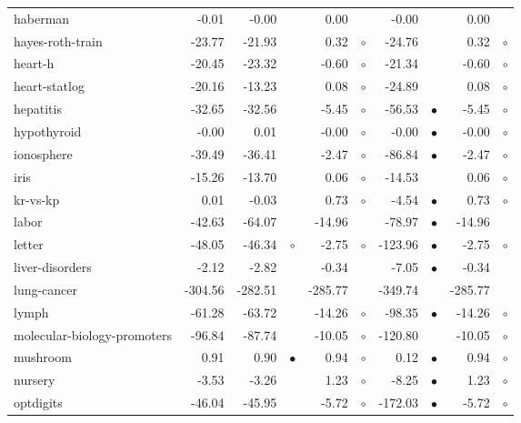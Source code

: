{\begin{longtable}{lrr@{\hspace{0.1cm}}cr@{\hspace{0.1cm}}cr@{\hspace{0.1cm}}cr@{\hspace{0.1cm}}c}
haberman &   -0.01 &   -0.00 &           &    0.00 &          &   -0.00 &           &    0.00 &         \\
hayes-roth-train &  -23.77 &  -21.93 &           &    0.32 &  $\circ$ &  -24.76 &           &    0.32 &  $\circ$\\
heart-h &  -20.45 &  -23.32 &           &   -0.60 &  $\circ$ &  -21.34 &           &   -0.60 &  $\circ$\\
heart-statlog &  -20.16 &  -13.23 &           &    0.08 &  $\circ$ &  -24.89 &           &    0.08 &  $\circ$\\
hepatitis &  -32.65 &  -32.56 &           &   -5.45 &  $\circ$ &  -56.53 & $\bullet$ &   -5.45 &  $\circ$\\
hypothyroid &   -0.00 &    0.01 &           &   -0.00 &  $\circ$ &   -0.00 & $\bullet$ &   -0.00 &  $\circ$\\
ionosphere &  -39.49 &  -36.41 &           &   -2.47 &  $\circ$ &  -86.84 & $\bullet$ &   -2.47 &  $\circ$\\
iris &  -15.26 &  -13.70 &           &    0.06 &  $\circ$ &  -14.53 &           &    0.06 &  $\circ$\\
kr-vs-kp &    0.01 &   -0.03 &           &    0.73 &  $\circ$ &   -4.54 & $\bullet$ &    0.73 &  $\circ$\\
labor &  -42.63 &  -64.07 &           &  -14.96 &          &  -78.97 & $\bullet$ &  -14.96 &         \\
letter &  -48.05 &  -46.34 &   $\circ$ &   -2.75 &  $\circ$ & -123.96 & $\bullet$ &   -2.75 &  $\circ$\\
liver-disorders &   -2.12 &   -2.82 &           &   -0.34 &          &   -7.05 & $\bullet$ &   -0.34 &         \\
lung-cancer & -304.56 & -282.51 &           & -285.77 &          & -349.74 &           & -285.77 &         \\
lymph &  -61.28 &  -63.72 &           &  -14.26 &  $\circ$ &  -98.35 & $\bullet$ &  -14.26 &  $\circ$\\
molecular-biology-promoters &  -96.84 &  -87.74 &           &  -10.05 &  $\circ$ & -120.80 &           &  -10.05 &  $\circ$\\
mushroom &    0.91 &    0.90 & $\bullet$ &    0.94 &  $\circ$ &    0.12 & $\bullet$ &    0.94 &  $\circ$\\
nursery &   -3.53 &   -3.26 &           &    1.23 &  $\circ$ &   -8.25 & $\bullet$ &    1.23 &  $\circ$\\
optdigits &  -46.04 &  -45.95 &           &   -5.72 &  $\circ$ & -172.03 & $\bullet$ &   -5.72 &  $\circ$\\

\end{longtable}}
